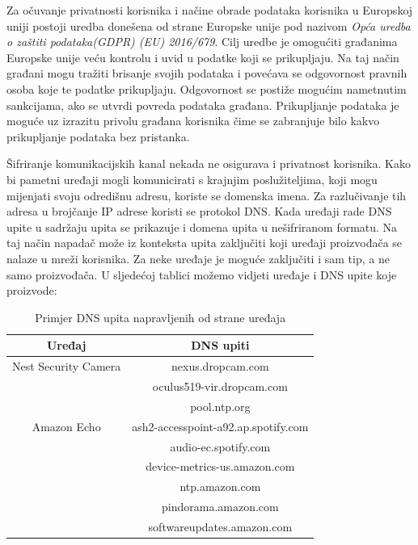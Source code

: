 \documentclass[times, utf8, diplomski]{fer}
\begin{document}
Za očuvanje privatnosti korisnika i načine obrade podataka korisnika u Europskoj uniji postoji uredba donešena od strane Europske unije pod nazivom \emph{Opća uredba o zaštiti podataka(GDPR) (EU) 2016/679}\citep{GDPR}. Cilj uredbe je omogućiti građanima Europske unije veću kontrolu i uvid u podatke koji se prikupljaju. Na taj način građani mogu tražiti brisanje svojih podataka i povećava se odgovornost pravnih osoba koje te podatke prikupljaju. Odgovornost se postiže mogućim nametnutim sankcijama, ako se utvrdi povreda podataka građana. Prikupljanje podataka je moguće uz izrazitu privolu građana korisnika čime se zabranjuje bilo kakvo prikupljanje podataka bez pristanka. 

Šifriranje komunikacijskih kanal nekada ne osigurava i privatnost korisnika. Kako bi pametni uređaji mogli komunicirati s krajnjim poslužiteljima, koji mogu mijenjati svoju odredišnu adresu, koriste se domenska imena. Za razlučivanje tih adresa u brojčanje IP adrese koristi se protokol DNS. Kada uređaji rade DNS upite u sadržaju upita se prikazuje i domena upita u nešifriranom formatu. Na taj način napadač može iz konteksta upita zaključiti koji uređaji proizvođača se nalaze u mreži korisnika. Za neke uređaje je moguće zaključiti i sam tip, a ne samo proizvođača. U sljedećoj tablici možemo vidjeti uređaje i DNS upite koje proizvode:

\begin{table}[h]
    \centering
    \caption{Primjer DNS upita napravljenih od strane uređaja \citep{Apthorpe2017May}}
    \begin{tabular}{| c | c |} 
    \hline
    \textbf{Uređaj} & \textbf{DNS upiti} \\
    \hline\hline
    Nest Security Camera & nexus.dropcam.com \\
     & oculus519-vir.dropcam.com \\
     & pool.ntp.org \\
    \hline
    Amazon Echo & ash2-accesspoint-a92.ap.spotify.com \\ 
     & audio-ec.spotify.com \\ 
     & device-metrics-us.amazon.com \\ 
     & ntp.amazon.com \\ 
     & pindorama.amazon.com \\ 
     & softwareupdates.amazon.com \\
    \hline
    \end{tabular}
    \label{tab:confusion}
\end{table} 
\end{document}
